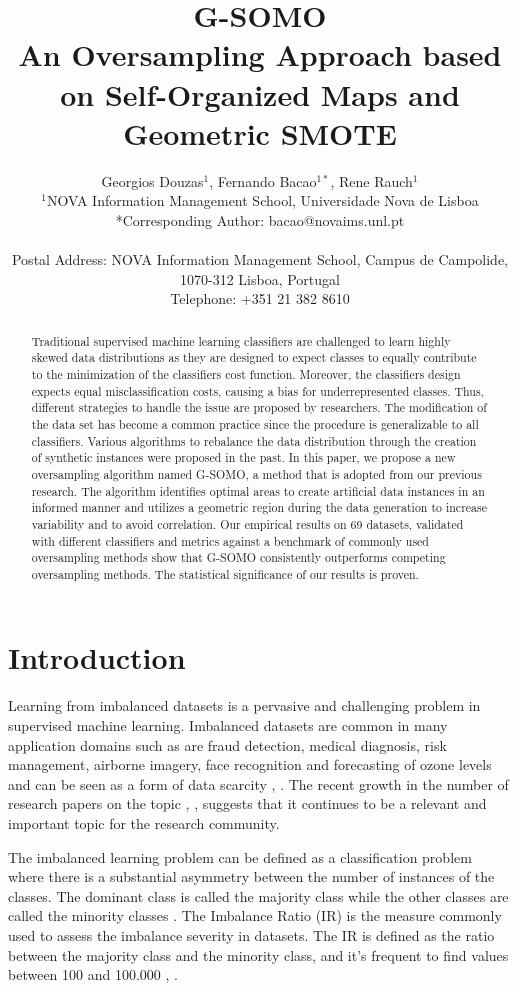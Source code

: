 \documentclass[parskip=full]{scrartcl}
\title{G-SOMO \\ \LARGE{An Oversampling Approach based on Self-Organized Maps and Geometric SMOTE}}
\author{
	Georgios Douzas\(^{1}\), Fernando Bacao\(^{1*}\), Rene Rauch\(^{1}\)
	\\
	\small{\(^{1}\)NOVA Information Management School, Universidade Nova de Lisboa}
	\\
	\small{*Corresponding Author: bacao@novaims.unl.pt}
	\\
	\\
	\small{Postal Address: NOVA Information Management School, Campus de Campolide, 1070-312 Lisboa, Portugal}
	\\
	\small{Telephone: +351 21 382 8610}
}
\date{}
\begin{document}
\maketitle

\begin{abstract}
Traditional supervised machine learning classifiers are challenged to learn
highly skewed data distributions as they are designed to expect classes to
equally contribute to the minimization of the classifiers cost function.
Moreover, the classifiers design expects equal misclassification costs, causing
a bias for underrepresented classes. Thus, different strategies to handle the
issue are proposed by researchers. The modification of the data set has become a
common practice since the procedure is generalizable to all classifiers. Various
algorithms to rebalance the data distribution through the creation of synthetic
instances were proposed in the past.  In this paper, we propose a new
oversampling algorithm named G-SOMO, a method that is adopted from our previous
research. The algorithm identifies optimal areas to create artificial data
instances in an informed manner and utilizes a geometric region during the data
generation to increase variability and to avoid correlation. Our empirical
results on 69 datasets, validated with different classifiers and metrics against
a benchmark of commonly used oversampling methods show that G-SOMO consistently
outperforms competing oversampling methods. The statistical significance of our
results is proven. 
\end{abstract}

\section{Introduction}

Learning from imbalanced datasets is a pervasive and challenging problem in
supervised machine learning. Imbalanced datasets are common in many application
domains such as are fraud detection, medical diagnosis, risk management,
airborne imagery, face recognition and forecasting of ozone levels and can be
seen as a form of data scarcity \cite{Vong2014}, \cite{He2009}. The recent
growth in the number of research papers on the topic \cite{Haixiang2017},
\cite{Fernandez2018},  suggests that it continues to be a relevant and important
topic for the research community.

The imbalanced learning problem can be defined as a classification problem where
there is a substantial asymmetry between the number of instances of the classes.
The dominant class is called the majority class while the other classes are
called the minority classes \cite{Chawla2003}. The Imbalance Ratio (IR) is the
measure commonly used to assess the imbalance severity in datasets. The IR is
defined as the ratio between the majority class and the minority class, and it’s
frequent to find values between 100 and 100.000 \cite{Chawla2002},
\cite{Barua2014}.
\end{document}
